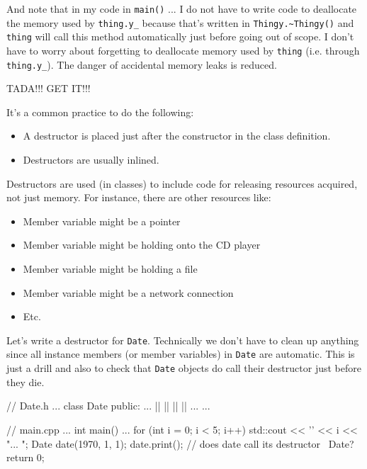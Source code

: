 And note that in my code in \texttt{main()} ... I do not have to
write code to deallocate the memory used by \texttt{thing.y\_} because
that's written in \texttt{Thingy.\~{}Thingy()}
and \texttt{thing} will call this method automatically just before going
out of scope. I don't have to worry about forgetting to
deallocate memory used by \texttt{thing} (i.e. through \texttt{thing.y\_}).
The danger of accidental memory leaks is reduced.

TADA!!! GET IT!!!

It's a common practice to do the following:

\begin{itemize}
\item A destructor is placed just after the constructor in the class
  definition.
\item Destructors are usually inlined.
\end{itemize}



Destructors are used (in classes) to include code for releasing
resources acquired, not just memory. For instance, there are other
resources like:

\begin{itemize}
\item Member variable might be a pointer
\item Member variable might be holding onto the CD player
\item Member variable might be holding a file
\item Member variable might be a network connection
\item Etc.
\end{itemize}

Let's write a destructor for \texttt{Date}. Technically we
don't have to clean up anything since all instance
members (or member variables) in \texttt{Date} are automatic. This is just
a drill and also to check that \texttt{Date} objects do call their
destructor just before they die.

\begin{consolethree}[escapeinside=||]
// Date.h
...
class Date
{
public:
    ...
    ||
    |\EMPHASIZE{\{}|
        ||
    |\EMPHASIZE{\}}|
    ...
}
...
\end{consolethree}

\begin{consolethree}[escapeinside=||]
// main.cpp
...
int main()
{
    ...
    for (int i = 0; i < 5; i++)
    {
        std::cout << '\n' << i << "... \n";
        Date date(1970, 1, 1);
        date.print();
        // does date call its destructor ~Date?
    }
    return 0;
}
\end{consolethree}


